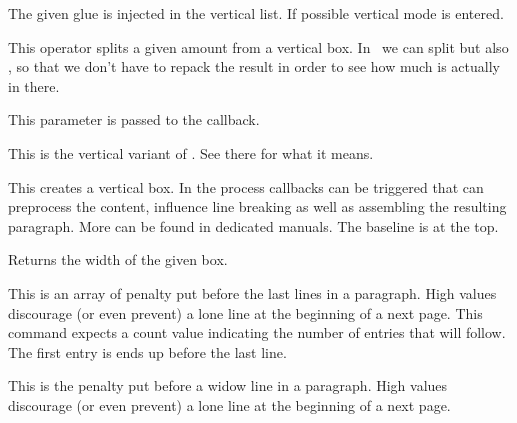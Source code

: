 \stopoldprimitive

\startoldprimitive[title={\prm {vskip}}]

The given glue is injected in the vertical list. If possible vertical mode is
entered.

\stopoldprimitive

\startoldprimitive[title={\prm {vsplit}}]

This operator splits a given amount from a vertical box. In \LUAMETATEX\ we can
split  but also , so that we don't have to repack the
result in order to see how much is actually in there.

\stopoldprimitive

\startnewprimitive[title={\prm {vsplitchecks}}]

This parameter is passed to the  callback.

\stopnewprimitive

\startoldprimitive[title={\prm {vss}}]

This is the vertical variant of . See there for what it means.

\stopoldprimitive

\startoldprimitive[title={\prm {vtop}}]

This creates a vertical box. In the process callbacks can be triggered that can
preprocess the content, influence line breaking as well as assembling the
resulting paragraph. More can be found in dedicated manuals. The baseline is
at the top.

\stopoldprimitive

\startoldprimitive[title={\prm {wd}}]

Returns the width of the given box.

\stopoldprimitive

\startoldprimitive[title={\prm {widowpenalties}}]

This is an array of penalty put before the last lines in a paragraph. High values
discourage (or even prevent) a lone line at the beginning of a next page. This
command expects a count value indicating the number of entries that will follow.
The first entry is ends up before the last line.

\stopoldprimitive

\startoldprimitive[title={\prm {widowpenalty}}]

This is the penalty put before a widow line in a paragraph. High values
discourage (or even prevent) a lone line at the beginning of a next page.

